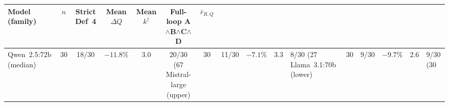 \begin{tabular}{lcccccc}
\toprule
\textbf{Model (family)} & \textbf{$n$} & \textbf{Strict Def~4} & \textbf{Mean $\Delta Q$} & \textbf{Mean $k^\dagger$} & \textbf{Full-loop A$\wedge$B$\wedge$C$\wedge$D} & \textbf{$\bar{r}_{R,Q}$} \\
\midrule
Qwen~2.5:72b (median) & 30 & 18/30 & $-11.8\%$ & $3.0$ & 20/30 (67%
Mistral-large (upper) & 30 & 11/30 & $-7.1\%$ & $3.3$ & 8/30 (27%
Llama~3.1:70b (lower) & 30 & 9/30 & $-9.7\%$ & $2.6$ & 9/30 (30%
\bottomrule
\end{tabular}